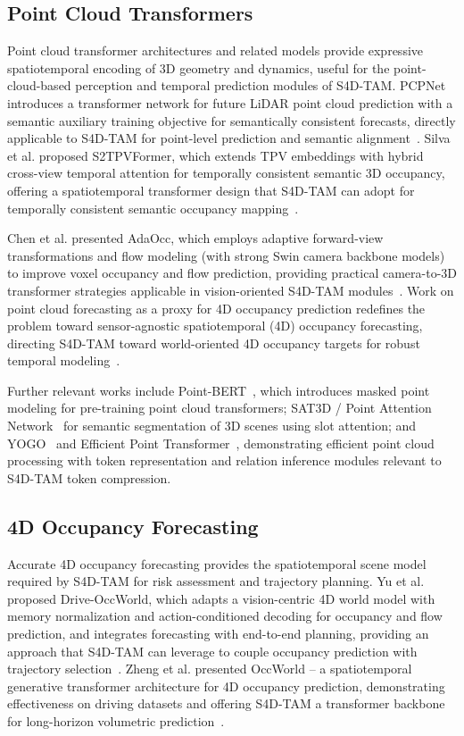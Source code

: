 \subsection{Point Cloud Transformers}
\label{subsec:point_cloud_transformers}

Point cloud transformer architectures and related models provide expressive spatiotemporal encoding of 3D geometry and dynamics, useful for the point-cloud-based perception and temporal prediction modules of S4D-TAM. PCPNet introduces a transformer network for future LiDAR point cloud prediction with a semantic auxiliary training objective for semantically consistent forecasts, directly applicable to S4D-TAM for point-level prediction and semantic alignment~\cite{pcpnet2024}. Silva et al. proposed S2TPVFormer, which extends TPV embeddings with hybrid cross-view temporal attention for temporally consistent semantic 3D occupancy, offering a spatiotemporal transformer design that S4D-TAM can adopt for temporally consistent semantic occupancy mapping~\cite{silva2024s2tpvformer}.

Chen et al. presented AdaOcc, which employs adaptive forward-view transformations and flow modeling (with strong Swin camera backbone models) to improve voxel occupancy and flow prediction, providing practical camera-to-3D transformer strategies applicable in vision-oriented S4D-TAM modules~\cite{chen2024adaocc}. Work on point cloud forecasting as a proxy for 4D occupancy prediction redefines the problem toward sensor-agnostic spatiotemporal (4D) occupancy forecasting, directing S4D-TAM toward world-oriented 4D occupancy targets for robust temporal modeling~\cite{yu2025driveoccworld}.

Further relevant works include Point-BERT~\cite{yu2022pointbert}, which introduces masked point modeling for pre-training point cloud transformers; SAT3D / Point Attention Network~\cite{ji2020point} for semantic segmentation of 3D scenes using slot attention; and YOGO~\cite{zhang2021you} and Efficient Point Transformer~\cite{he2024efficient, guo2021pct}, demonstrating efficient point cloud processing with token representation and relation inference modules relevant to S4D-TAM token compression.

\subsection{4D Occupancy Forecasting}
\label{subsec:occupancy_forecasting}

Accurate 4D occupancy forecasting provides the spatiotemporal scene model required by S4D-TAM for risk assessment and trajectory planning. Yu et al. proposed Drive-OccWorld, which adapts a vision-centric 4D world model with memory normalization and action-conditioned decoding for occupancy and flow prediction, and integrates forecasting with end-to-end planning, providing an approach that S4D-TAM can leverage to couple occupancy prediction with trajectory selection~\cite{yu2025driveoccworld}. Zheng et al. presented OccWorld -- a spatiotemporal generative transformer architecture for 4D occupancy prediction, demonstrating effectiveness on driving datasets and offering S4D-TAM a transformer backbone for long-horizon volumetric prediction~\cite{zheng2024occworld}.

